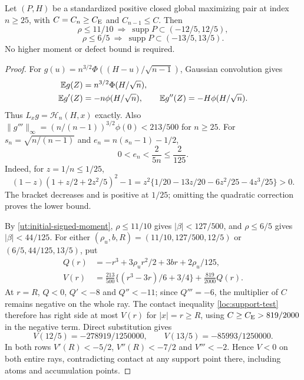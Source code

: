 \begin{proposition}\label{gc:initial-support}
Let $(P,H)$ be a standardized positive closed global maximizing pair
at index $n\ge25$, with $C=C_n\ge C_{\mathrm E}$ and $C_{n-1}\le C$.
Then
\[
 \rho\le11/10\ \Longrightarrow\ \operatorname{supp}P\subset(-12/5,12/5),
\]
\[
 \rho\le6/5\ \Longrightarrow\ \operatorname{supp}P\subset(-13/5,13/5).
\]
No higher moment or defect bound is required.
\end{proposition}
\begin{proof}
For $g(u)=n^{3/2}\Phi((H-u)/\sqrt{n-1})$, Gaussian convolution gives
\begin{align*}
 \mathbb E g(Z)&=n^{3/2}\Phi(H/\sqrt n),\\
 \mathbb E g'(Z)&=-n\phi(H/\sqrt n),\qquad
 \mathbb E g''(Z)=-H\phi(H/\sqrt n).
\end{align*}
Thus $L_xg=\mathcal H_n(H,x)$ exactly. Also
$\|g'''\|_\infty=(n/(n-1))^{3/2}\phi(0)<213/500$ for $n\ge25$.
For $s_n=\sqrt{n/(n-1)}$ and $e_n=n(s_n-1)-1/2$,
\begin{equation}\label{gc:scale}
 0<e_n<\frac{2}{5n}\le\frac2{125}.
\end{equation}
Indeed, for $z=1/n\le1/25$,
\[
 (1-z)(1+z/2+2z^2/5)^2-1
 =z^2\{1/20-13z/20-6z^2/25-4z^3/25\}>0.
\]
The bracket decreases and is positive at $1/25$; omitting the
quadratic correction proves the lower bound.

By \eqref{ut:initial-signed-moment}, $\rho\le11/10$ gives
$|\beta|<127/500$, and $\rho\le6/5$ gives $|\beta|<44/125$.
For either $(\rho_u,b,R)=(11/10,127/500,12/5)$ or
$(6/5,44/125,13/5)$, put
\begin{align*}
 Q(r)&=-r^3+3\rho_ur^2/2+3br+2\rho_u/125,\\
 V(r)&=\frac{213}{500}\{(r^3-3r)/6+3/4\}
                                      +\frac{819}{2000}Q(r).
\end{align*}
At $r=R$, $Q<0$, $Q'<-8$ and $Q''<-11$; since $Q'''=-6$,
the multiplier of $C$ remains negative on the whole ray.
The contact inequality \eqref{loc:support-test} therefore has
right side at most $V(r)$ for $|x|=r\ge R$, using
$C\ge C_{\mathrm E}>819/2000$ in the negative term. Direct substitution gives
\[
 V(12/5)=-278919/1250000,\qquad V(13/5)=-85993/1250000.
\]
In both rows $V'(R)<-5/2$, $V''(R)<-7/2$ and $V'''<-2$.
Hence $V<0$ on both entire rays, contradicting contact at any
support point there, including atoms and accumulation points.
\end{proof}

